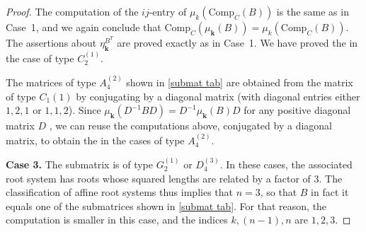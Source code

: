 \documentclass{amsart}
\theoremstyle{definition}
\theoremstyle{remark}
\numberwithin{equation}{section}
\newcommand{\0}{{\mathbf{0}}}
\newcommand{\Comp}{\mathrm{Comp}_C}
\newcommand{\kk}{\mathbf{k}}
\begin{document}
\begin{proof}
The computation of the $ij$-entry of $\mu_k(\Comp(B))$ is the same as in Case~1, and we again conclude that $\Comp(\mu_\kk(B))=\mu_k(\Comp(B))$.
The assertions about $\eta^{B^T}_\kk$ are proved exactly as in Case~1.
We have proved the  in the case of type $C_2^{(1)}$.

The matrices of type $A_4^{(2)}$ shown in \cref{submat tab} are obtained from the matrix of type $C_1{(1)}$ by conjugating by a diagonal matrix (with diagonal entries either $1,2,1$ or $1,1,2$).
Since $\mu_\kk(D^{-1}BD)=D^{-1}\mu_\kk(B)D$ for any positive diagonal matrix $D$ \cite[Proposition~4.5]{ca1}, we can reuse the computations above, conjugated by a diagonal matrix, to obtain the  in the cases of type $A_4^{(2)}$.

\noindent
\textbf{Case 3.}
The submatrix is of type  $G_2^{(1)}$ or $D_4^{(3)}$.
In these cases, the associated root system has roots whose squared lengths are related by a factor of $3$.
The classification of affine root systems thus implies that $n=3$, so that $B$ in fact it equals one of the submatrices shown in \cref{submat tab}.
For that reason, the computation is smaller in this case, and the indices $k,(n-1),n$ are $1,2,3$.


\end{proof}
\end{document}
